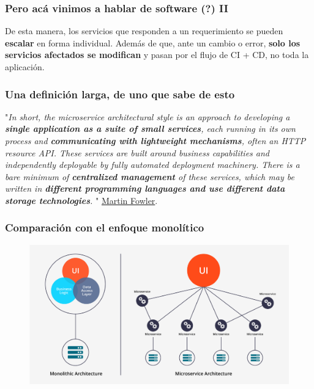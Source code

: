 \documentclass{beamer}
\begin{document}
\begin{frame}
    \frametitle{Pero acá vinimos a hablar de software (?) II}
	De esta manera, los servicios que responden a un requerimiento se pueden \textbf{escalar} en forma individual. Además de que, ante un cambio o error, \textbf{solo los servicios afectados se modifican} y pasan por el flujo de CI + CD, no toda la aplicación.
\end{frame}

\begin{frame}
    \frametitle{Una definición larga, de uno que sabe de esto}
	"\textsl{In short, the microservice architectural style is an approach to developing a \textbf{single application as a suite of small services}, each running in its own process and \textbf{communicating with lightweight mechanisms}, often an HTTP resource API. These services are built around business capabilities and independently deployable by fully automated deployment machinery. There is a bare minimum of \textbf{centralized management} of these services, which may be written in \textbf{different programming languages and use different data storage technologies}. }" \href{https://martinfowler.com/articles/microservices.html}{Martin Fowler}.
\end{frame}

\begin{frame}
	\frametitle{Comparación con el enfoque monolítico}
	\begin{figure}[htp]
	\centering
	\includegraphics[scale=0.33]{img/comparacion.png}
	\end{figure}
\end{frame}
\end{document}
